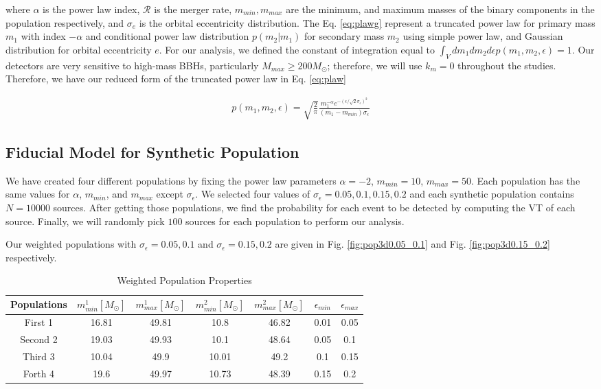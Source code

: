 \documentclass[twocolumn,prd,nofootinbib]{revtex4}
\begin{document}
where $\alpha$ is the power law index, $\mathcal{R}$ is the merger rate, $m_{min}, m_{max}$ are the minimum, and maximum masses of the binary components in the population respectively, and $\sigma_e$ is the orbital eccentricity distribution. The Eq. \ref{eq:plawg} represent a truncated power law for primary mass $m_1$ with index $-\alpha$ and conditional power law distribution $p(m_2|m_1)$ for secondary mass $m_2$ using simple power law, and Gaussian distribution for orbital eccentricity $e$. 
For our analysis, we defined the constant of integration equal to $\int_V dm_1 dm_2 d\epsilon p(m_1,m_2,\epsilon) = 1$.  Our detectors are very sensitive to high-mass BBHs, particularly $M_{max}\geq 200 M_\odot$; therefore, we will use $k_m=0$ throughout the studies. Therefore, we have our reduced form of the truncated power law in Eq. \ref{eq:plaw}

\begin{align}
\label{eq:plaw}
p(m_1,m_2,\epsilon) = \sqrt{\frac{2}{\pi}} \frac{ m_1^{-\alpha}  e^{-(\epsilon/\sqrt{2}\sigma_\epsilon)^2}}{(m_1-m_{min})\sigma_\epsilon}
\end{align}


\subsection{Fiducial Model for Synthetic Population}

We have created four different populations by fixing the
power law parameters $\alpha = -2$, $m_{min} = 10$, $m_{max}=50$. Each population has the same values for $\alpha$, $m_{min}$, and $m_{max}$ except $\sigma_\epsilon$. We selected four values of $\sigma_\epsilon = 0.05,0.1,0.15,0.2$ and each synthetic population contains $N=10000$ sources. After getting those populations, we find the probability for each event to be detected by computing the VT of each source. Finally, we will randomly pick $100$ sources for each population to perform our analysis.

Our weighted populations with $\sigma_\epsilon=0.05, 0.1$ and $\sigma_\epsilon=0.15, 0.2$ are given in Fig. \ref{fig:pop3d0.05_0.1} and Fig. \ref{fig:pop3d0.15_0.2} respectively. 
 

\begin{table}[]
    \centering
    \begin{tabular}{c|cccccc}
        \hline
        Populations & $m^1_{min} [M_\odot] $ & $m^1_{max} [M_\odot]$ & $m^2_{min} [M_\odot]$ & $m^2_{max} [M_\odot]$ & $\epsilon_{min}$ & $\epsilon_{max}$\\ \hline
        First 1 & 16.81 & 49.81 & 10.8 & 46.82 & 0.01 & 0.05\\ \hline
        Second 2 & 19.03 & 49.93 & 10.1 & 48.64 & 0.05 & 0.1\\ \hline
        Third 3 & 10.04 & 49.9 & 10.01 & 49.2 & 0.1 & 0.15\\ \hline
        Forth 4 & 19.6 & 49.97 & 10.73 & 48.39 & 0.15 & 0.2\\ \hline
    \end{tabular}
    \caption{Weighted Population Properties}
    \label{tab:pop_prop}
\end{table}
\end{document}

